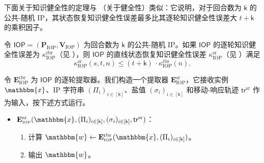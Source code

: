\documentclass[american,singlepageview]{snargs-book-zh}
\newcommand{\Instance}{\mathbbm{x}}
\newcommand{\Witness}{\mathbbm{w}}
\newcommand{\InstanceSize}{n}
\newcommand{\ProtoProver}{P}
\newcommand{\ProtoVerifier}{V}
\newcommand{\ProtoExtractor}{E}
\newcommand{\ProtoKnowledgeError}{\kappa}
\newcommand{\ProtoRoundComplexity}{\mathsf{k}}
\newcommand{\RoundIndex}{i}
\newcommand{\SRSuperscript}{\mathrm{sr}}
\newcommand{\ProtoSRKnowledgeError}{\ProtoKnowledgeError^{\SRSuperscript}}
\newcommand{\ProtoRBRKnowledgeError}{\ProtoKnowledgeError^{\RBRSuperscript}}
\newcommand{\IOPSymbol}{\mathsf{IOP}}
\newcommand{\IOPSubscript}{\scriptscriptstyle\mathrm{IOP}}
\newcommand{\IOPFormat}[1]{\mathbf{#1}}
\newcommand{\IOPProver}{\IOPFormat{\ProtoProver}_{\IOPSubscript}}
\newcommand{\IOPVerifier}{\IOPFormat{\ProtoVerifier}_{\IOPSubscript}}
\newcommand{\IOPExtractor}{\IOPFormat{\ProtoExtractor}_{\IOPSubscript}}
\newcommand{\IOPSystem}{(\IOPProver,\IOPVerifier)}
\newcommand{\IOPString}{\Pi}
\newcommand{\IOPRoundComplexity}{\ProtoRoundComplexity}
\newcommand{\IOPStrings}{(\IOPString_{\RoundIndex})_{\RoundIndex \in [\IOPRoundComplexity]}}
\newcommand{\ROTrace}{\mathsf{tr}}
\newcommand{\SRBudget}{t}
\newcommand{\SRSaltSize}{s}
\newcommand{\SRSaltString}{\sigma}
\newcommand{\SRTrace}{\ROTrace^{\SRSuperscript}}
\newcommand{\IOPSRKnowledgeError}{\ProtoSRKnowledgeError_{\IOPSubscript}}
\newcommand{\IOPSRExtractor}{\IOPExtractor^{\SRSuperscript}}
\newcommand{\RBRSuperscript}{\mathrm{rbr}}
\newcommand{\RBRKnowledgeError}{\ProtoRBRKnowledgeError_{\IOPSubscript}}
\newcommand{\IOPRBRExtractor}{\IOPExtractor^{\RBRSuperscript}}
\begin{document}
下面关于知识健全性的定理与 （关于健全性）类似：它说明，对于回合数为 $\IOPRoundComplexity$ 的公共-随机 IP，其状态恢复知识健全性误差最多比其逐轮知识健全性误差大 $\SRBudget+\IOPRoundComplexity$ 的乘积因子。

\begin{theorem}
\label{theorem:rbr-knowledge-soundness-to-sr-knowledge-soundness}
令 $\IOPSymbol=\IOPSystem$ 为回合数为 $\IOPRoundComplexity$ 的公共-随机 IP。如果 $\IOPSymbol$ 的逐轮知识健全性误差为 $\RBRKnowledgeError$（见 ），则 $\IOPSymbol$ 的直线状态恢复知识健全性误差 $\IOPSRKnowledgeError$（见 ）满足
\[
\IOPSRKnowledgeError(\SRSaltSize,\SRBudget,\InstanceSize)
\leq
(\SRBudget+\IOPRoundComplexity)\,
\cdot
\RBRKnowledgeError(\InstanceSize).
\]
\end{theorem}

\begin{construction}
\label{construction:straightline-sr-extractor-from-rbr-extractor}
令 $\IOPRBRExtractor$ 为 $\IOPSymbol$ 的逐轮提取器。我们构造一个提取器 $\IOPSRExtractor$，它接收实例 $\Instance$、IP 字符串 $\IOPStrings$、盐值 $(\SRSaltString_{\RoundIndex})_{\RoundIndex\in[\IOPRoundComplexity]}$ 和移动-响应轨迹 $\SRTrace$ 作为输入，按下述方式运行。
\begin{itemize}
  \item[] $\IOPSRExtractor(\Instance,\IOPStrings,(\SRSaltString_{\RoundIndex})_{\RoundIndex\in[\IOPRoundComplexity]},\SRTrace)$：
  \begin{enumerate}[noitemsep]
    \item 计算 $\Witness \gets \IOPRBRExtractor(\Instance,\IOPStrings)$。
    \item 输出 $\Witness$。
  \end{enumerate}
\end{itemize}
\end{construction}
\end{document}
